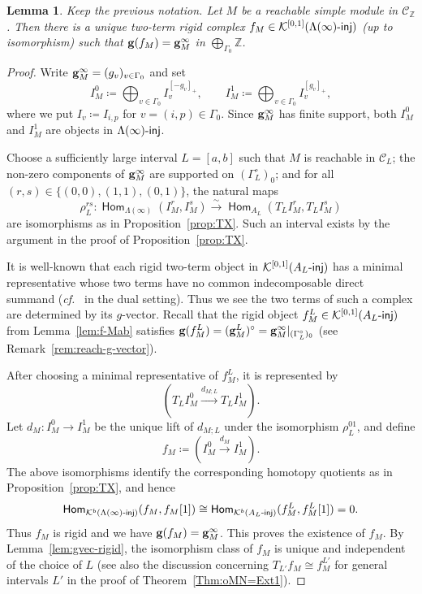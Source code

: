 \documentclass[12pt]{amsart}
\newtheorem{lemma}[theorem]{Lemma}
\theoremstyle{definition}
\theoremstyle{remark}
\numberwithin{equation}{section}
\newcommand{\opname}[1]{\operatorname{\mathsf{#1}}}
\newcommand{\Hom}{\opname{Hom}}
\newcommand{\confer}{\textit{cf.}\ }
\newcommand{\injc}{\mathchar`-\mathsf{inj}}
\newcommand{\cK}{\mathcal{K}}
\begin{document}
\begin{lemma}\label{Lem:KM}
Keep the previous notation.
Let $M$ be a reachable simple module in $\mathcal{C}_\mathbb{Z}$. Then there is a unique two-term rigid complex $f_M\in \mathcal{K}^{[0,1]}(\Lambda(\infty)\injc)$ (up to isomorphism) such that ${\bf g}(f_M)={\bf g}_M^\infty$ in $\bigoplus_{\Gamma_0}\mathbb Z$. 
\end{lemma}
\begin{proof}
Write ${\bf g}_M^\infty=(g_v)_{v\in\Gamma_0}$ and set
\[
 I_M^0\coloneqq\bigoplus_{v\in\Gamma_0}I_v^{[-g_v]_+},
 \qquad
 I_M^1\coloneqq\bigoplus_{v\in\Gamma_0}I_v^{[g_v]_+},
\]
where we put $I_v\coloneqq I_{i,p}$ for $v=(i,p)\in \Gamma_0$.
Since ${\bf g}_M^\infty$ has finite support, both $I_M^0$ and
$I_M^1$ are objects in $\Lambda(\infty)\injc$.



Choose a sufficiently large interval $L=[a,b]$ such that $M$ is
reachable in $\mathcal C_L$;
the non-zero components of ${\bf g}_M^\infty$ are supported on $(\Gamma_L^\circ)_0$;
and for all $(r,s)\in \{(0,0),(1,1),(0,1)\}$, the natural maps
\[
\rho_L^{rs}\colon
\Hom_{\Lambda(\infty)}(I_M^r,I_M^s)
\xrightarrow{\sim}
\Hom_{A_L}(T_LI_M^r,T_LI_M^s)
\]
are isomorphisms as in Proposition~\ref{prop:TX}. Such an interval exists by the
argument in the proof of Proposition~\ref{prop:TX}.


It is well-known that each rigid two-term object in $\cK^{[0,1]}(A_L\injc)$ has a minimal representative whose two terms have no common indecomposable direct summand (\confer \cite[Proposition~2.5]{air_2014} in the dual setting).
Thus we see the two terms of such a complex are determined by its $g$-vector. Recall that the rigid object $f_M^L \in \cK^{[0,1]}(A_L\injc)$ from Lemma~\ref{lem:f-Mab} satisfies ${\bf g}(f_M^L)=({\bf g}_M^L)^\circ={\bf g}_M^\infty|_{(\Gamma_{L}^\circ)_0}$ (see Remark~\ref{rem:reach-g-vector}).

After choosing a minimal representative of $f_M^L$,  it is represented by
\[
\left(T_LI_M^0\xrightarrow{d_{M;L}}T_LI_M^1\right).
\]
Let $d_M\colon I_M^0\to I_M^1$ be the unique lift of $d_{M;L}$
under the isomorphism $\rho_L^{01}$, and define
\[
 f_M\coloneqq\left(I_M^0\xrightarrow{d_M}I_M^1\right).
\]
The above isomorphisms identify the corresponding homotopy quotients as in Proposition~\ref{prop:TX},
and hence
\[
 \Hom_{\mathcal K^b(\Lambda(\infty)\injc)}(f_M,f_M[1])
 \cong
 \Hom_{\mathcal K^b(A_L\injc)}(f_M^L,f_M^L[1])
 =0.
\]
Thus $f_M$ is rigid and we have
$\mathbf g(f_M)={\bf g}_M^\infty$. This proves the existence of $f_M$. By Lemma~\ref{lem:gvec-rigid}, the isomorphism class of $f_M$ is unique and independent of the choice of $L$ (see also the discussion concerning $T_{L'}f_M\cong f_M^{L'}$ for general intervals $L'$ in the proof of Theorem~\ref{Thm:oMN=Ext1}).
\end{proof}
\end{document}
